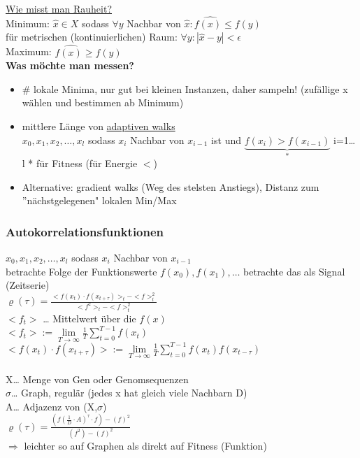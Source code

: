 \underline{Wie misst man Rauheit?}\\
Minimum: $\hat{x} \in X$ sodass $\forall y$ Nachbar von $\hat{x}: f\hat{(x)} \leq f(y)$\\
für metrischen (kontinuierlichen) Raum: $\forall y: |\hat{x} - y| < \epsilon$\\
Maximum: $f\hat{(x)} \geq f(y)$\\

\textbf{Was möchte man messen?}
\begin{itemize}
	\item \# lokale Minima, nur gut bei kleinen Instanzen, daher sampeln! (zufällige x wählen und bestimmen ab Minimum)
	\item mittlere Länge von \underline{adaptiven walks}\\
	$x_0,x_1, x_2, …, x_l$ sodass $x_i$ Nachbar von $x_{i-1}$ ist und $\underbrace{f(x_i) > f(x_{i-1})}_{*}$ i=1…l
	* für Fitness (für Energie $<$)
	\item Alternative: gradient walks (Weg des stelsten Anstiegs), Distanz zum ''nächstgelegenen" lokalen Min/Max
\end{itemize}

\subsubsection{Autokorrelationsfunktionen}
$x_0,x_1, x_2, …, x_l$ sodass $x_i$ Nachbar von $x_{i-1}$\\
betrachte Folge der Funktionswerte $f(x_0), f(x_1), …$
betrachte das als Signal (Zeitserie)\\
$\varrho(\tau)=\displaystyle \frac{<f(x_t) \cdot f(x_{t+\tau})>_t - <f>^2_t}{<f^2>_t - <f>^2_t}$\\
$<f_t>$ … Mittelwert über die $f(x)$\\
$<f_t> := \lim\limits_{T \rightarrow \infty} \frac{1}{T} \sum_{t=0}^{T-1} f(x_t)$\\
$<f(x_t) \cdot f(x_{t+\tau})> := \lim\limits_{T \rightarrow \infty} \frac{1}{T} \sum_{t=0}^{T-1} f(x_t)f(x_{t-\tau})$\\\\
X… Menge von Gen oder Genomsequenzen\\
$\sigma$… Graph, regulär (jedes x hat gleich viele Nachbarn D)\\
A… Adjazenz von (X,$\sigma$)\\

$\varrho(\tau)=\displaystyle \frac{(f(\frac{1}{D} \cdot A)^{\tau} \cdot f) - (f)^2}{(f^2) - (f)^2}$\\
$\Rightarrow$ leichter so auf Graphen als direkt auf Fitness (Funktion)\\

